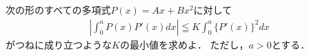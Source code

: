 \documentclass[../../main.tex]{subfiles}
\begin{document}
次の形のすべての多項式$P(x)=Ax+Bx^2$に対して
\begin{align}
  \left| \int_0^a P(x)P'(x)dx \right| \leqq K\int_0^a { \{ P'(x) \} }^2 dx
\end{align}
がつねに成り立つような$K$の最小値を求めよ．
ただし，$a>0$とする．
\end{document}
